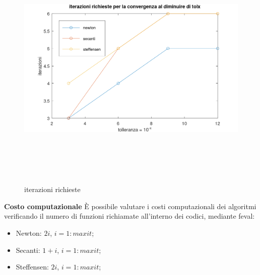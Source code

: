 \begin{figure}[h!]
        \includegraphics[width=16cm,height=12cm,keepaspectratio]{capitolo2/es6_figure.png}
        \caption{iterazioni richieste}
        \label{fig:es6}
\end{figure}
\newline \textbf{Costo computazionale} \newline
È possibile valutare i costi computazionali dei algoritmi verificando il numero
di funzioni richiamate all'interno dei codici, mediante feval:
\begin{itemize}
        \item Newton: $2i$, $i=1:maxit$;
        \item Secanti: $1 + i$, $i=1:maxit$;
        \item Steffensen: $2i$, $i=1:maxit$;
\end{itemize}
